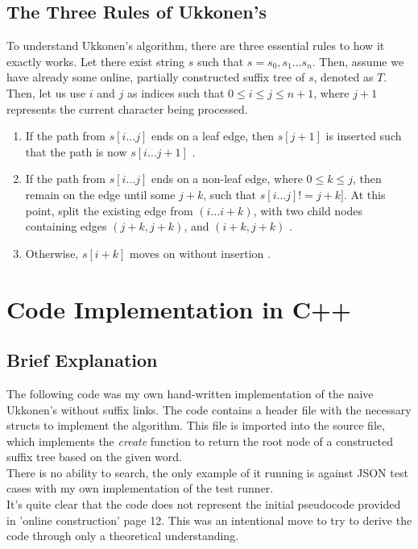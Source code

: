 \documentclass{article}
\begin{document}
	\subsection{The Three Rules of Ukkonen's}
	To understand Ukkonen's algorithm, there are three essential rules to how it exactly works.  Let there exist string $s$ such that $s = s_0, s_1 \dots s_n$.  Then, assume we have already some online, partially constructed suffix tree of $s$, denoted as $T$.  Then, let us use $i$ and $j$ as indices such that $0 \le i \le j \le n + 1$, where $j + 1$ represents the current character being processed.
	\begin{enumerate}[label=(Rule.\arabic*)]
		\item  If the path from $s[i\dots j]$ ends on a leaf edge, then $s[j + 1]$ is inserted such that the path is now $s[i\dots j+ 1]$ \cite[p.~9, l.~6]{gomez}.
		\item  If the path from $s[i\dots j]$ ends on a non-leaf edge, where $0 \le k \le j$, then remain on the edge until some $j + k$, such that $s[i\dots j] != j + k]$.  At this point, split the existing edge from $(i\dots i + k)$, with two child nodes containing edges $(j + k, j + k)$, and $(i + k, j + k)$ \cite[p.~9, l.~7]{gomez}.
		\item  Otherwise, $s[i + k]$ moves on without insertion \cite[p.~9, l.~8]{gomez}.
	\end{enumerate}
	
	\clearpage
	\section{Code Implementation in C++}
	\subsection{Brief Explanation}
	The following code was my own hand-written implementation of the naive Ukkonen's without suffix links.  The code contains a header file with the necessary structs to implement the algorithm.  This file is imported into the source file, which implements the \textit{create} function to return the root node of a constructed suffix tree based on the given word.  \\
	There is no ability to search, the only example of it running is against JSON test cases with my own implementation of the test runner.
	\\
	It's quite clear that the code does not represent the initial pseudocode provided in 'online construction' page 12.  This was an intentional move to try to derive the code through only a theoretical understanding.
\end{document}
